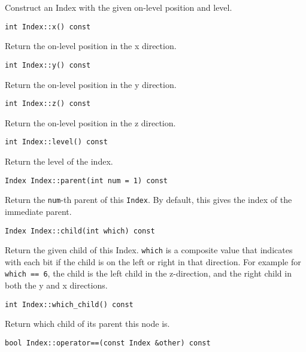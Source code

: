 \noindent Construct an Index with the given on-level position and level.

\begin{lstlisting}
int Index::x() const
\end{lstlisting}

\noindent Return the on-level position in the x direction.

\begin{lstlisting}
int Index::y() const
\end{lstlisting}

\noindent Return the on-level position in the y direction.

\begin{lstlisting}
int Index::z() const
\end{lstlisting}

\noindent Return the on-level position in the z direction.

\begin{lstlisting}
int Index::level() const
\end{lstlisting}

\noindent Return the level of the index.

\begin{lstlisting}
Index Index::parent(int num = 1) const
\end{lstlisting}

\noindent Return the \texttt{num}-th parent of this \texttt{Index}. By default,
this gives the index of the immediate parent.

\begin{lstlisting}
Index Index::child(int which) const
\end{lstlisting}

\noindent Return the given child of this Index. \texttt{which} is a
composite value
that indicates with each bit if the child is on the left or right in that
direction. For example for \texttt{which == 6}, the child is the left child
in the z-direction, and the right child in both the y and x directions.

\begin{lstlisting}
int Index::which_child() const
\end{lstlisting}

\noindent Return which child of its parent this node is.

\begin{lstlisting}
bool Index::operator==(const Index &other) const
\end{lstlisting}

